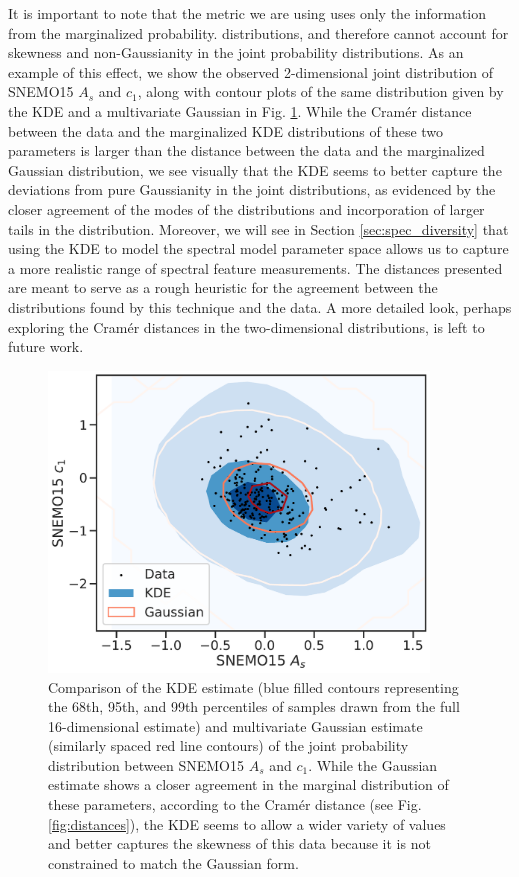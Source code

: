 It is important to note that the metric we are using uses only the information from the marginalized probability. distributions, and therefore cannot account for skewness and non-Gaussianity in the joint probability distributions. As an example of this effect, we show the observed 2-dimensional joint distribution of SNEMO15 $A_s$ and $c_1$, along with contour plots of the same distribution given by the KDE and a multivariate Gaussian in Fig. \ref{fig:snemo15_joint_example}. While the Cram\'{e}r distance between the data and the marginalized KDE distributions of these two parameters is larger than the distance between the data and the marginalized Gaussian distribution, we see visually that the KDE seems to better capture the deviations from pure Gaussianity in the joint distributions, as evidenced by the closer agreement of the modes of the distributions and incorporation of larger tails in the distribution. Moreover, we will see in Section \ref{sec:spec_diversity} that using the KDE to model the spectral model parameter space allows us to capture a more realistic range of spectral feature measurements. The distances presented are meant to serve as a rough heuristic for the agreement between the distributions found by this technique and the data. A more detailed look, perhaps exploring the Cram\'{e}r distances in the two-dimensional distributions, is left to future work.

\begin{figure}
    \centering
    \includegraphics[width=0.9\textwidth]{figures/snemo_kde/snemo15_nongaussian_example.pdf}
    \caption{Comparison of the KDE estimate (blue filled contours representing the 68th, 95th, and 99th percentiles of samples drawn from the full 16-dimensional estimate) and multivariate Gaussian estimate (similarly spaced red line contours) of the joint probability distribution between SNEMO15 $A_s$ and $c_1$. While the Gaussian estimate shows a closer agreement in the marginal distribution of these parameters, according to the Cram\'{e}r distance (see Fig. \ref{fig:distances}), the KDE seems to allow a wider variety of values and better captures the skewness of this data because it is not constrained to match the Gaussian form.}
    \label{fig:snemo15_joint_example}
\end{figure}

